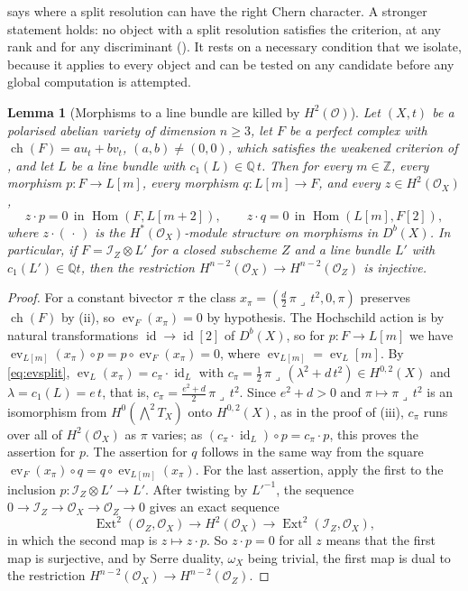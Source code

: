 \documentclass[11pt,reqno]{amsart}
\theoremstyle{plain}
\newtheorem{lemma}[theorem]{Lemma}
\theoremstyle{definition}
\theoremstyle{remark}
\newcommand{\QQ}{\mathbb{Q}}
\newcommand{\ZZ}{\mathbb{Z}}
\newcommand{\cO}{\mathcal{O}}
\newcommand{\cI}{\mathcal{I}}
\DeclareMathOperator{\ch}{ch}
\DeclareMathOperator{\Hom}{Hom}
\DeclareMathOperator{\Ext}{Ext}
\DeclareMathOperator{\id}{id}
\begin{document}
 says where a split resolution can have the right
Chern character. A stronger statement holds: no object with a split
resolution satisfies the criterion, at any rank and for any discriminant
(). It
rests on a necessary condition that we isolate, because it applies to
every object and can be tested on any candidate before any global
computation is attempted.

\begin{lemma}[Morphisms to a line bundle are killed by $H^{2}(\cO)$]
\label{lem:annihilation}
Let $(X,t)$ be a polarised abelian variety of dimension $n\ge3$, let $F$ be
a perfect complex with $\ch(F)=au_{t}+bv_{t}$, $(a,b)\ne(0,0)$, which
satisfies the weakened criterion of , and let $L$ be a
line bundle with $c_{1}(L)\in\QQ\,t$. Then for every $m\in\ZZ$, every
morphism $p\colon F\to L[m]$, every morphism $q\colon L[m]\to F$, and every
$z\in H^{2}(\cO_{X})$,
\[
  z\cdot p=0\ \ \text{in }\Hom(F,L[m+2]),\qquad
  z\cdot q=0\ \ \text{in }\Hom(L[m],F[2]),
\]
where $z\cdot(\,\cdot\,)$ is the $H^{*}(\cO_{X})$-module structure on
morphisms in $D^{b}(X)$. In particular, if $F=\cI_{Z}\otimes L'$ for a closed
subscheme $Z$ and a line bundle $L'$ with $c_{1}(L')\in\QQ t$, then the
restriction $H^{n-2}(\cO_{X})\to H^{n-2}(\cO_{Z})$ is injective.
\end{lemma}

\begin{proof}
For a constant bivector $\pi$ the class
$x_{\pi}=(\tfrac d2\,\pi\lrcorner\,t^{2},0,\pi)$ preserves $\ch(F)$ by
(ii), so $\operatorname{ev}_{F}(x_{\pi})=0$ by hypothesis.
The Hochschild action is by natural transformations $\id\to\id[2]$ of
$D^{b}(X)$, so for $p\colon F\to L[m]$ we have
$\operatorname{ev}_{L[m]}(x_{\pi})\circ p=p\circ\operatorname{ev}_{F}(x_{\pi})=0$,
where $\operatorname{ev}_{L[m]}=\operatorname{ev}_{L}[m]$. By
\eqref{eq:evsplit}, $\operatorname{ev}_{L}(x_{\pi})=c_{\pi}\cdot\id_{L}$ with
$c_{\pi}=\tfrac12\,\pi\lrcorner\,(\lambda^{2}+d\,t^{2})\in H^{0,2}(X)$ and
$\lambda=c_{1}(L)=e\,t$, that is,
$c_{\pi}=\tfrac{e^{2}+d}{2}\,\pi\lrcorner\,t^{2}$. Since $e^{2}+d>0$ and
$\pi\mapsto\pi\lrcorner\,t^{2}$ is an isomorphism from
$H^{0}(\bigwedge^{2}T_{X})$ onto $H^{0,2}(X)$, as in the proof of
(iii), $c_{\pi}$ runs over all of $H^{2}(\cO_{X})$ as $\pi$
varies; as $(c_{\pi}\cdot\id_{L})\circ p=c_{\pi}\cdot p$, this proves the
assertion for $p$. The assertion for $q$ follows in the same way from the
square
$\operatorname{ev}_{F}(x_{\pi})\circ q=q\circ\operatorname{ev}_{L[m]}(x_{\pi})$.
For the last assertion, apply the first to the inclusion
$p\colon\cI_{Z}\otimes L'\to L'$. After twisting by $L'^{-1}$, the sequence
$0\to\cI_{Z}\to\cO_{X}\to\cO_{Z}\to0$ gives an exact sequence
\[
  \Ext^{2}(\cO_{Z},\cO_{X})\longrightarrow H^{2}(\cO_{X})
  \longrightarrow\Ext^{2}(\cI_{Z},\cO_{X}),
\]
in which the second map is $z\mapsto z\cdot p$. So $z\cdot p=0$ for all $z$
means that the first map is surjective, and by Serre duality, $\omega_{X}$
being trivial, the first map is dual to the restriction
$H^{n-2}(\cO_{X})\to H^{n-2}(\cO_{Z})$.
\end{proof}
\end{document}
